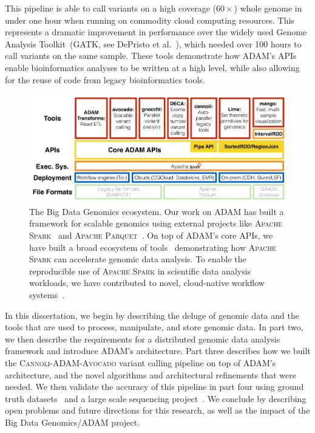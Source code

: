 \documentclass[phd]{ucbthesis}
\begin{document}
This pipeline is able to call variants on a high coverage ($60\times$) whole
genome in under one hour when running on commodity cloud computing resources.
This represents a dramatic improvement in performance over the widely used
Genome Analysis Toolkit~(GATK, see DePristo et al.~\cite{depristo11}), which
needed over 100 hours to call variants on the same sample. These tools
demonstrate how \textsc{ADAM}'s APIs enable bioinformatics analyses to be
written at a high level, while also allowing for the reuse of code from legacy
bioinformatics tools.

\begin{figure}[h]
  \begin{center}
    \includegraphics[width=0.95\linewidth]{graphs/bdgenomics-stack.pdf}
  \end{center}
  \caption{The Big Data Genomics ecosystem. Our work on \textsc{ADAM} has
    built a framework for scalable genomics using external projects like
    \textsc{Apache Spark}~\cite{zaharia12} and \textsc{Apache
      Parquet}~\cite{parquet}. On top of \textsc{ADAM}'s core APIs, we have
    built a broad ecosystem of tools~\cite{tu16, morrow17, linderman17}
    demonstrating how \textsc{Apache Spark} can accelerate genomic data
    analysis. To enable the reproducible use of \textsc{Apache Spark} in
    scientific data analysis workloads, we have contributed to novel,
    cloud-native workflow systems~\cite{vivian17}.}
  \label{fig:bdg}
\end{figure}

In this dissertation, we begin by describing the deluge of genomic data and the
tools that are used to process, manipulate, and store genomic data. In part two,
we then describe the requirements for a distributed genomic data analysis
framework and introduce \textsc{ADAM}'s architecture. Part three describes how
we built the \textsc{Cannoli}-\textsc{ADAM}-\textsc{Avocado} variant calling
pipeline on top of \textsc{ADAM}'s architecture, and the novel algorithms and
architectural refinements that were needed. We then validate the accuracy of
this pipeline in part four using ground truth datasets~\cite{zook15} and a large
scale sequencing project~\cite{mallick16}. We conclude by describing open
problems and future directions for this research, as well as the impact of the
Big Data Genomics/\textsc{ADAM} project.
\end{document}
